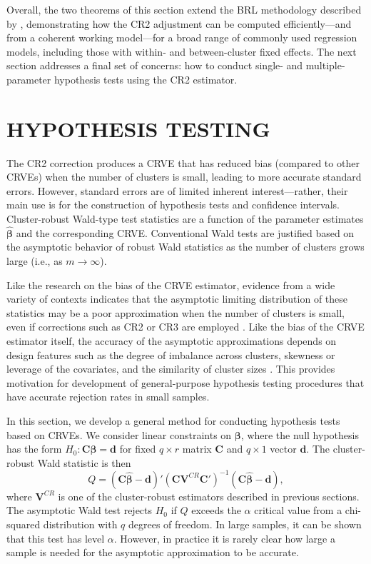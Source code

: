 \documentclass[12pt]{article}
\newcommand{\bm}{\mathbf}
\newcommand{\bs}{\boldsymbol}
\begin{document}
Overall, the two theorems of this section extend the BRL methodology described by \citet{Bell2002bias}, demonstrating how the CR2 adjustment can be computed efficiently---and from a coherent working model---for a broad range of commonly used regression models, including those with within- and between-cluster fixed effects.
The next section addresses a final set of concerns: how to conduct single- and multiple-parameter hypothesis tests using the CR2 estimator. 

\section{HYPOTHESIS TESTING}
\label{sec:testing}

The CR2 correction produces a CRVE that has reduced bias (compared to other CRVEs) when the number of clusters is small, leading to more accurate standard errors. However, standard errors are of limited inherent interest---rather, their main use is for the construction of hypothesis tests and confidence intervals.
Cluster-robust Wald-type test statistics are a function of the parameter estimates $\bs{\hat\beta}$ and the corresponding CRVE.
Conventional Wald tests are justified based on the asymptotic behavior of robust Wald statistics as the number of clusters grows large (i.e., as $m \to \infty$). 

Like the research on the bias of the CRVE estimator, evidence from a wide variety of contexts indicates that the asymptotic limiting distribution of these statistics may be a poor approximation when the number of clusters is small, even if corrections such as CR2 or CR3 are employed \citep{Bell2002bias, Bertrand2004how, Cameron2008bootstrap}. 
Like the bias of the CRVE estimator itself, the accuracy of the asymptotic approximations depends on design features such as the degree of imbalance across clusters, skewness or leverage of the covariates, and the similarity of cluster sizes \citep{McCaffrey2001generalizations, Tipton2015small-F, Webb2013wild, Carter2013asymptotic}. 
This provides motivation for development of general-purpose hypothesis testing procedures that have accurate rejection rates in small samples.

In this section, we develop a general method for conducting hypothesis tests based on CRVEs. We consider linear constraints on $\bs\beta$, where the null hypothesis has the form $H_0: \bm{C}\bs\beta = \bm{d}$ for fixed $q \times r$ matrix $\bm{C}$ and $q \times 1$ vector $\bm{d}$. 
The cluster-robust Wald statistic is then
\begin{equation}
\label{eq:Wald_stat}
Q = \left(\bm{C}\bs{\hat\beta} - \bm{d}\right)'\left(\bm{C} \bm{V}^{CR} \bm{C}'\right)^{-1}\left(\bm{C}\bs{\hat\beta} - \bm{d}\right),
\end{equation}
where $\bm{V}^{CR}$ is one of the cluster-robust estimators described in previous sections. 
The asymptotic Wald test rejects $H_0$ if $Q$ exceeds the $\alpha$ critical value from a chi-squared distribution with $q$ degrees of freedom. 
In large samples, it can be shown that this test has level $\alpha$. 
However, in practice it is rarely clear how large a sample is needed for the asymptotic approximation to be accurate. 
\end{document}
